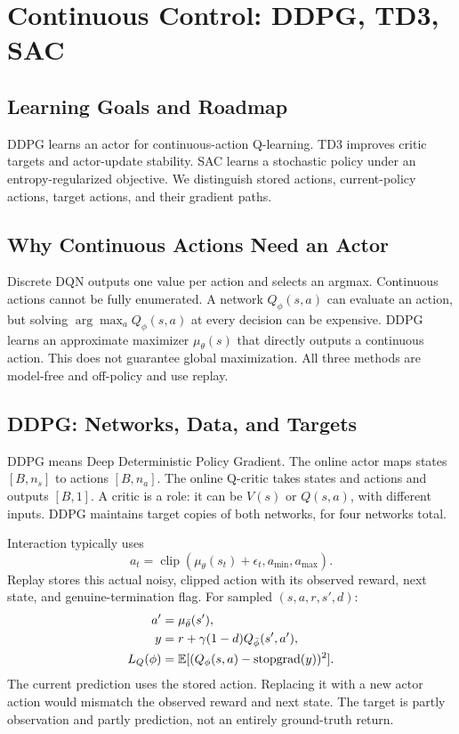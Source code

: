 \chapter{Continuous Control: DDPG, TD3, SAC}
\section{Learning Goals and Roadmap}
DDPG learns an actor for continuous-action Q-learning.
TD3 improves critic targets and actor-update stability.
SAC learns a stochastic policy under an entropy-regularized objective.
We distinguish stored actions, current-policy actions, target actions,
and their gradient paths.

\section{Why Continuous Actions Need an Actor}
Discrete DQN outputs one value per action and selects an argmax.
Continuous actions cannot be fully enumerated. A network $Q_\phi(s,a)$
can evaluate an action, but solving $\arg\max_a Q_\phi(s,a)$ at every
decision can be expensive. DDPG learns an approximate maximizer
$\mu_\theta(s)$ that directly outputs a continuous action.
This does not guarantee global maximization.
All three methods are model-free and off-policy and use replay.

\section{DDPG: Networks, Data, and Targets}
DDPG means Deep Deterministic Policy Gradient.
The online actor maps states $[B,n_s]$ to actions $[B,n_a]$.
The online Q-critic takes states and actions and outputs $[B,1]$.
A critic is a role: it can be $V(s)$ or $Q(s,a)$, with different inputs.
DDPG maintains target copies of both networks, for four networks total.

Interaction typically uses
\begin{equation}
a_t=\operatorname{clip}(\mu_\theta(s_t)+\epsilon_t,a_{\min},a_{\max}).
\end{equation}
Replay stores this actual noisy, clipped action with its observed
reward, next state, and genuine-termination flag.
For sampled $(s,a,r,s',d)$:
\begin{align}
a'&=\mu_{\bar\theta}(s'),\\
y&=r+\gamma(1-d)Q_{\bar\phi}(s',a'),\\
L_Q(\phi)&=\mathbb{E}[(Q_\phi(s,a)-\operatorname{stopgrad}(y))^2].
\end{align}
The current prediction uses the stored action. Replacing it with
a new actor action would mismatch the observed reward and next state.
The target is partly observation and partly prediction, not an
entirely ground-truth return.

